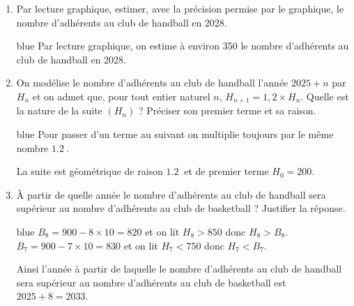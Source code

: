 \documentclass[10pt]{article}
\providecommand{\np}[2][]{{#2~#1}}
\begin{document}
	\begin{enumerate}[start=4]
		\item Par lecture graphique, estimer, avec la précision permise par le graphique, le nombre d'adhérents au club de handball en 2028.
		
		
		\begin{color}{blue}
		Par lecture graphique, on estime à environ 350 le nombre d'adhérents au club de handball en 2028.
		\end{color}
		
		
		\item On modélise le nombre d'adhérents au club de handball l'année $2025+n$ par $H_{n}$ et on admet que, pour tout entier naturel $n$, $H_{n+1}=1{,}2\times H_{n}$. Quelle est la nature de la suite $\left(H_{n}\right)$ ? Préciser son premier terme et sa raison.
		
		\begin{color}{blue}
		Pour passer d'un terme au suivant on multiplie toujours par le même nombre $\np{1.2}$.
		
		La suite est géométrique de raison $\np{1.2}$ et de premier terme $H_{0} = 200$.
		\end{color}
		
		\item À partir de quelle année le nombre d'adhérents au club de handball sera supérieur au nombre d'adhérents au club de basketball ? Justifier la réponse.
		
		\begin{color}{blue}
		$B_{8} = 900 - 8 \times 10 = 820 $ et on lit $H_{8} > 850$ donc $H_{8} > B_{8}$.
		$B_{7} = 900 - 7 \times 10 = 830 $ et on lit $H_{7} < 750$ donc $H_{7} < B_{7}$.
		
		Ainsi l'année à partir de laquelle le nombre d'adhérents au club de handball sera supérieur au nombre d'adhérents au club de basketball est $2025+8 = 2033$.
		\end{color}
		
	\end{enumerate}
\end{document}

